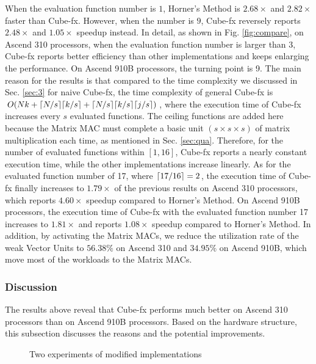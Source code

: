 When the evaluation function number is $1$, Horner's Method is $2.68\times$ and $2.82\times$ faster than Cube-fx. However, when the number is $9$, Cube-fx reversely reports $2.48\times$ and $1.05\times$ speedup instead. In detail, as shown in Fig. \ref{fig:compare}, on Ascend 310 processors, when the evaluation function number is larger than 3, Cube-fx reports better efficiency than other implementations and keeps enlarging the performance. On Ascend 910B processors, the turning point is 9. The main reason for the results is that compared to the time complexity we discussed in Sec. \ref{sec:3} for naive Cube-fx, the time complexity of general Cube-fx is $O(Nk + \lceil N / s\rceil \lceil k / s\rceil + \lceil N / s\rceil \lceil k / s\rceil \lceil j / s\rceil)$, where the execution time of Cube-fx increases every $s$ evaluated functions. The ceiling functions are added here because the Matrix MAC must complete a basic unit $(s \times s \times s)$ of matrix multiplication each time, as mentioned in Sec. \ref{sec:qua}. Therefore, for the number of evaluated functions within $[1, 16]$, Cube-fx reports a nearly constant execution time, while the other implementations increase linearly. As for the evaluated function number of 17, where $\lceil17 / 16\rceil = 2$, the execution time of Cube-fx finally increases to $1.79\times$ of the previous results on Ascend 310 processors, which reports $4.60\times$ speedup compared to Horner's Method. On Ascend 910B processors, the execution time of Cube-fx with the evaluated function number 17 increases to $1.81\times$ and reports $1.08\times$ speedup compared to Horner's Method. In addition, by activating the Matrix MACs, we reduce the utilization rate of the weak Vector Units to $56.38\%$ on Ascend 310 and $34.95\%$ on Ascend 910B, which move most of the workloads to the Matrix MACs.

\subsubsection{Discussion}

The results above reveal that Cube-fx performs much better on Ascend 310 processors than on Ascend 910B processors. Based on the hardware structure, this subsection discusses the reasons and the potential improvements.

\begin{figure}[tbp]
  \caption{Two experiments of modified implementations}
  \label{fig:disc}
  \end{figure}

